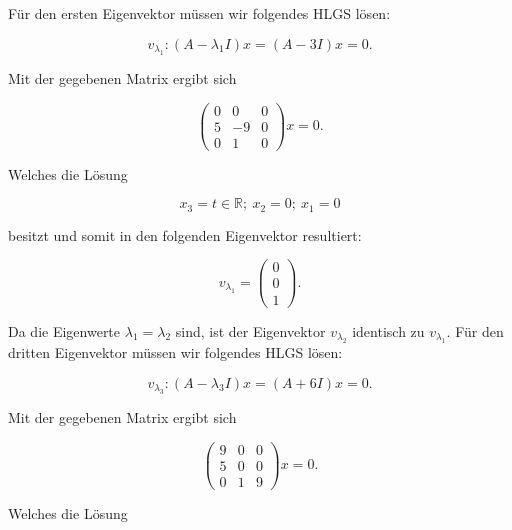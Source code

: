 \vspace{1\baselineskip}

Für den ersten Eigenvektor müssen wir folgendes HLGS lösen:

\begin{equation*}
    v_{\lambda_1}: (A - \lambda_1 I) x = (A - 3I) x = 0. 
\end{equation*}

Mit der gegebenen Matrix ergibt sich

\begin{equation*}
        \begin{pmatrix} 0 & 0 & 0 \\ 5 & -9 & 0 \\ 0 & 1 & 0 \end{pmatrix} x = 0. 
\end{equation*}

Welches die Lösung

\begin{equation*}
        x_3 = t \in \mathbb{R};\ x_2 = 0;\ x_1 = 0 
\end{equation*}

besitzt und somit in den folgenden Eigenvektor resultiert:

\begin{equation*}
        v_{\lambda_1} = \begin{pmatrix} 0 \\ 0 \\ 1 \end{pmatrix}.
\end{equation*}

Da die Eigenwerte \( \lambda_1 = \lambda_2 \) sind, ist der Eigenvektor \( v_{\lambda_2} \) identisch zu \( v_{\lambda_1} \). Für den dritten Eigenvektor müssen wir folgendes HLGS lösen:

\begin{equation*}
    v_{\lambda_3}: (A - \lambda_3 I) x = (A + 6I) x = 0.
\end{equation*}

Mit der gegebenen Matrix ergibt sich

\begin{equation*}
        \begin{pmatrix} 9 & 0 & 0 \\ 5 & 0 & 0 \\ 0 & 1 & 9 \end{pmatrix} x = 0.
\end{equation*}

Welches die Lösung

